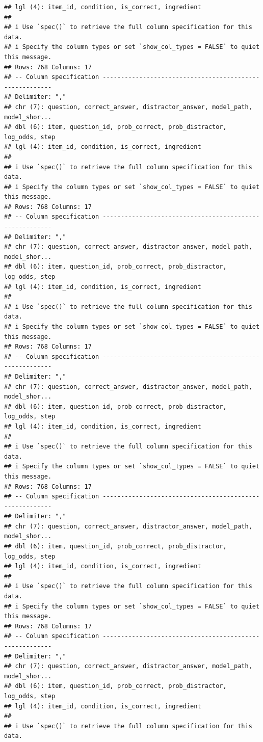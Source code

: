 \documentclass[
]{article}
\begin{document}
\begin{verbatim}
## lgl (4): item_id, condition, is_correct, ingredient
## 
## i Use `spec()` to retrieve the full column specification for this data.
## i Specify the column types or set `show_col_types = FALSE` to quiet this message.
## Rows: 768 Columns: 17
## -- Column specification --------------------------------------------------------
## Delimiter: ","
## chr (7): question, correct_answer, distractor_answer, model_path, model_shor...
## dbl (6): item, question_id, prob_correct, prob_distractor, log_odds, step
## lgl (4): item_id, condition, is_correct, ingredient
## 
## i Use `spec()` to retrieve the full column specification for this data.
## i Specify the column types or set `show_col_types = FALSE` to quiet this message.
## Rows: 768 Columns: 17
## -- Column specification --------------------------------------------------------
## Delimiter: ","
## chr (7): question, correct_answer, distractor_answer, model_path, model_shor...
## dbl (6): item, question_id, prob_correct, prob_distractor, log_odds, step
## lgl (4): item_id, condition, is_correct, ingredient
## 
## i Use `spec()` to retrieve the full column specification for this data.
## i Specify the column types or set `show_col_types = FALSE` to quiet this message.
## Rows: 768 Columns: 17
## -- Column specification --------------------------------------------------------
## Delimiter: ","
## chr (7): question, correct_answer, distractor_answer, model_path, model_shor...
## dbl (6): item, question_id, prob_correct, prob_distractor, log_odds, step
## lgl (4): item_id, condition, is_correct, ingredient
## 
## i Use `spec()` to retrieve the full column specification for this data.
## i Specify the column types or set `show_col_types = FALSE` to quiet this message.
## Rows: 768 Columns: 17
## -- Column specification --------------------------------------------------------
## Delimiter: ","
## chr (7): question, correct_answer, distractor_answer, model_path, model_shor...
## dbl (6): item, question_id, prob_correct, prob_distractor, log_odds, step
## lgl (4): item_id, condition, is_correct, ingredient
## 
## i Use `spec()` to retrieve the full column specification for this data.
## i Specify the column types or set `show_col_types = FALSE` to quiet this message.
## Rows: 768 Columns: 17
## -- Column specification --------------------------------------------------------
## Delimiter: ","
## chr (7): question, correct_answer, distractor_answer, model_path, model_shor...
## dbl (6): item, question_id, prob_correct, prob_distractor, log_odds, step
## lgl (4): item_id, condition, is_correct, ingredient
## 
## i Use `spec()` to retrieve the full column specification for this data.

\end{verbatim}
\end{document}
